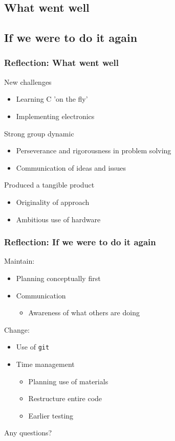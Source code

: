 \documentclass{beamer}
\begin{document}
\subsection{What went well}
\subsection{If we were to do it again}


\begin{frame}
\frametitle{Reflection: What went well}

New challenges
		\begin{itemize}
		\item Learning C 'on the fly'
		\item Implementing electronics
		\end{itemize}
Strong group dynamic
		\begin{itemize}
		\item Perseverance and rigorousness in problem solving
		\item Communication of ideas and issues
		\end{itemize}
Produced a tangible product
		\begin{itemize}
		\item Originality of approach
		\item Ambitious use of hardware
		\end{itemize}

\end{frame} 	



\begin{frame}
\frametitle{Reflection: If we were to do it again}

Maintain:
	\begin{itemize}
	\item Planning conceptually first
	\item Communication
		\begin{itemize}
		\item Awareness of what others are doing
		\end{itemize}
	\end{itemize}
Change:
	\begin{itemize}
	\item Use of {\tt git}
	\item Time management
		\begin{itemize}
		\item Planning use of materials
		\item Restructure entire code
		\item Earlier testing
		\end{itemize}
	\end{itemize}

\end{frame}


\begin{frame}
\Huge{\centerline{Any questions?}}
\end{frame}

\end{document}
